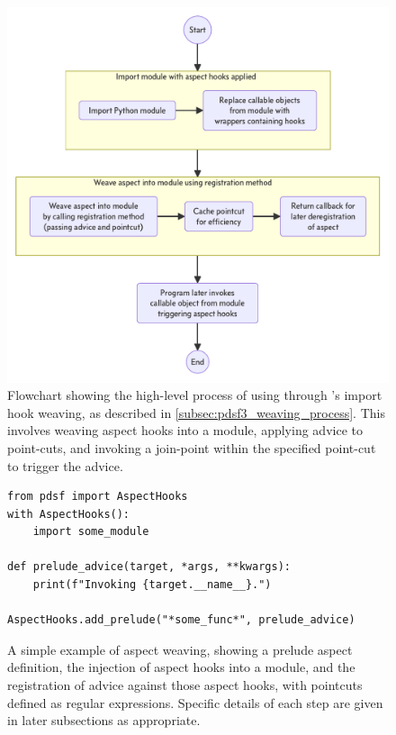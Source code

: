 \begin{figure}
  \centering
  \includegraphics[width=0.7\columnwidth]{40_pydysofu_rewrite/diagrams/aspect-hook-weaving-high-level.pdf}
  \caption{Flowchart showing the high-level process of using \aop{} through
  \pdsfthree{}'s import hook weaving, as described in
  \cref{subsec:pdsf3_weaving_process}. This involves weaving aspect hooks into a
  module, applying advice to point-cuts, and invoking a join-point within the
  specified point-cut to trigger the advice.}
  \label{fig:high-level-import-hook-weaving-steps}
\end{figure}


\begin{figure}
    \begin{lstlisting}[style=footnotesize_python]
from pdsf import AspectHooks
with AspectHooks():
    import some_module
    
def prelude_advice(target, *args, **kwargs):
    print(f"Invoking {target.__name__}.")

AspectHooks.add_prelude("*some_func*", prelude_advice)
    \end{lstlisting}
    \caption{A simple example of aspect weaving, showing a prelude aspect definition, the injection of aspect hooks into a module, and the registration of advice against those aspect hooks, with pointcuts defined as regular expressions. Specific details of each step are given in later subsections as appropriate.}
    \label{fig:simple_example_of_aspect_weaving}
\end{figure}

